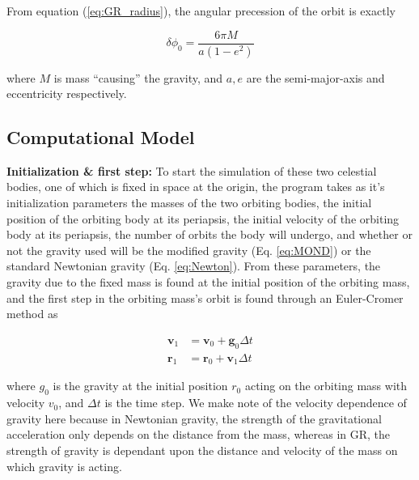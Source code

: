 \documentclass{report}
\begin{document}
            From equation (\ref{eq:GR_radius}), the angular precession of the orbit is exactly
            
            \begin{equation}
                \delta \phi_0 = \frac{6 \pi M}{a ( 1 - e^2)}
            \end{equation}
            
            where $M$ is mass ``causing'' the gravity, and $a, e$ are the semi-major-axis and eccentricity respectively.

        \subsection{Computational Model}
        
            \textbf{Initialization \& first step:} To start the simulation of these two celestial bodies, one of which is fixed in space at the origin, the program takes as it's initialization parameters the masses of the two orbiting bodies, the initial position of the orbiting body at its periapsis, the initial velocity of the orbiting body at its periapsis, the number of orbits the body will undergo, and whether or not the gravity used will be the modified gravity (Eq. \ref{eq:MOND}) or the standard Newtonian gravity (Eq. \ref{eq:Newton}).  From these parameters, the gravity due to the fixed mass is found at the initial position of the orbiting mass, and the first step in the orbiting mass's orbit is found through an Euler-Cromer method as
            
            \begin{subequations}
                \begin{align}
                    \mathbf{v}_{1} &= \mathbf{v}_0 + \mathbf{g}_0 \Delta t \\
                    \mathbf{r}_{1} &= \mathbf{r}_0 + \mathbf{v}_1 \Delta t
                \end{align}
            \end{subequations}
            
            where $g_0$ is the gravity at the initial position $r_0$ acting on the orbiting mass with velocity $v_0$, and $\Delta t$ is the time step.  We make note of the velocity dependence of gravity here because in Newtonian gravity, the strength of the gravitational acceleration only depends on the distance from the mass, whereas in GR, the strength of gravity is dependant upon the distance and velocity of the mass on which gravity is acting.
            
\end{document}
